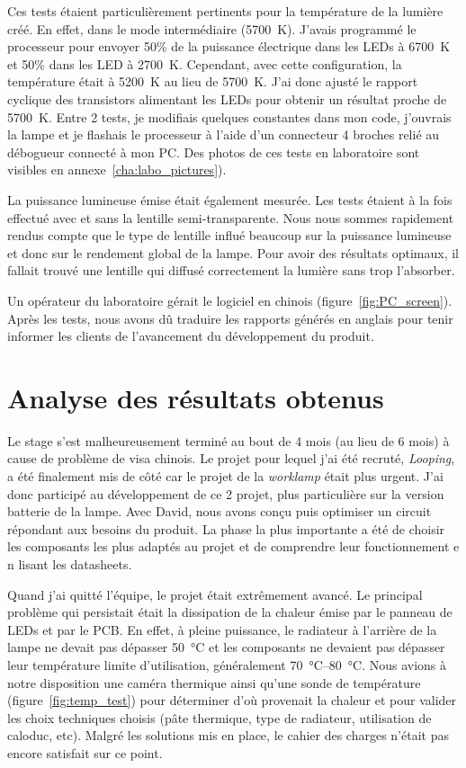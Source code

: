 \documentclass[a4paper, 12pt, sffamily]{report}
\begin{document}
Ces tests étaient particulièrement pertinents pour la température de la lumière créé. En effet, dans le mode intermédiaire (\SI{5700}{\kelvin}). J'avais programmé le processeur pour envoyer 50\% de la puissance électrique dans les LEDs à \SI{6700}{\kelvin} et 50\% dans les LED à \SI{2700}{\kelvin}. Cependant, avec cette configuration, la température était à \SI{5200}{\kelvin} au lieu de \SI{5700}{\kelvin}. J'ai donc ajusté le rapport cyclique des transistors alimentant les LEDs pour obtenir un résultat proche de \SI{5700}{\kelvin}. Entre 2 tests, je modifiais quelques constantes dans mon code, j'ouvrais la lampe et je flashais le processeur à l'aide d'un connecteur 4 broches relié au débogueur connecté à mon PC. Des photos de ces tests en laboratoire sont visibles en annexe~\ref{cha:labo_pictures}).

La puissance lumineuse émise était également mesurée. Les tests étaient à la fois effectué avec et sans la lentille semi-transparente. Nous nous sommes rapidement rendus compte que le type de lentille influé beaucoup sur la puissance lumineuse et donc sur le rendement global de la lampe. Pour avoir des résultats optimaux, il fallait trouvé une lentille qui diffusé correctement la lumière sans trop l'absorber.

Un opérateur du laboratoire gérait le logiciel en chinois (figure~\ref{fig:PC_screen}). Après les tests, nous avons dû traduire les rapports générés en anglais pour tenir informer les clients de l'avancement du développement du produit.  


\chapter{Analyse des résultats obtenus}

Le stage s'est malheureusement terminé au bout de 4 mois (au lieu de 6 mois) à cause de problème de visa chinois. Le projet pour lequel j'ai été recruté, \emph{Looping}, a été finalement mis de côté car le projet de la \emph{worklamp} était plus urgent. J'ai donc participé au développement de ce 2\ieme{} projet, plus particulière sur la version batterie de la lampe. Avec David, nous avons conçu puis optimiser un circuit répondant aux besoins du produit. La phase la plus importante a été de choisir les composants les plus adaptés au projet et de comprendre leur fonctionnement e n lisant les datasheets.

Quand j'ai quitté l'équipe, le projet était extrêmement avancé. Le principal problème qui persistait était la dissipation de la chaleur émise par le panneau de LEDs et par le PCB. En effet, à pleine puissance, le radiateur à l'arrière de la lampe ne devait pas dépasser \SI{50}{\celsius} et les composants ne devaient pas dépasser leur température limite d'utilisation, généralement \SIrange{70}{80}{\celsius}. Nous avions à notre disposition une caméra thermique ainsi qu'une sonde de température (figure~\ref{fig:temp_test}) pour déterminer d'où provenait la chaleur et pour valider les choix techniques choisis (pâte thermique, type de radiateur, utilisation de caloduc, etc). Malgré les solutions mis en place, le cahier des charges n'était pas encore satisfait sur ce point.
\end{document}
